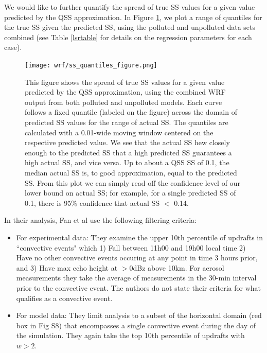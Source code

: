 \documentclass{article}
\begin{document}
We would like to further quantify the spread of true SS values for a given value predicted by the QSS approximation. In Figure \ref{ssquantiles}, we plot a range of quantiles for the true SS given the predicted SS, using the polluted and unpolluted data sets combined (see Table \ref{lsrtable} for details on the regression parameters for each case). 
\begin{figure}[ht]
	\centering
	\texttt{[image: wrf/ss\_quantiles\_figure.png]}
	\caption{This figure shows the spread of true SS values for a given value predicted by the QSS approximation, using the combined WRF output from both polluted and unpolluted models. Each curve follows a fixed quantile (labeled on the figure) across the domain of predicted SS values for the range of actual SS. The quantiles are calculated with a 0.01-wide moving window centered on the respective predicted value. We see that the actual SS hew closely enough to the predicted SS that a high predicted SS guarantees a high actual SS, and vice versa. Up to about a QSS SS of 0.1, the median actual SS is, to good approximation, equal to the predicted SS. From this plot we can simply read off the confidence level of our lower bound on actual SS; for example, for a single predicted SS of 0.1, there is 95\% confidence that actual SS $<$ 0.14.}
	\label{ssquantiles}
\end{figure}

In their analysis, Fan et al use the following filtering criteria:
\begin{itemize}
	\item For experimental data: They examine the upper 10th percentile of updrafts in ``convective events" which 1) Fall between 11h00 and 19h00 local time 2) Have no other convective events occuring at any point in time 3 hours prior, and 3) Have max echo height at $>$0dBz above 10km. For aerosol measurements they take the average of measurements in the 30-min interval prior to the convective event. The authors do not state their criteria for what qualifies as a convective event.
	\item For model data: They limit analysis to a subset of the horizontal domain (red box in Fig S8) that encompasses a single convective event during the day of the simulation. They again take the top 10th percentile of updrafts with $w>2$. 
\end{itemize}
\end{document}
